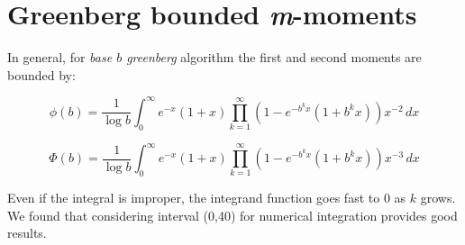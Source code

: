 \begin{appendices}
\begin{table}[H]
\caption[\emph{Clipped Modified Binary Tree}: Performance report.]{\emph{Clipped Modified Binary Tree}: performance report. Experimental results obtained by running CMBT algorithm on  random generated instances.}
\begin{center}
\end{center}
\end{table}


\section{Greenberg bounded \emph{m}-moments}
\label{sec:greenberg-moments}
In general, for \emph{base $b$ greenberg} algorithm the first and second moments are bounded by:

\begin{equation}
\phi(b)= \frac{1}{\log b} \int_{0}^{\infty} \! e^{-x}(1+x) \prod_{k=1}^{\infty}(1-e^{-b^{k}x}(1+b^{k}x))x^{-2} \, dx
\label{eq:greenberg-b-phi}
\end{equation}

\begin{equation}
\Phi(b)= \frac{1}{\log b} \int_{0}^{\infty} \! e^{-x}(1+x) \prod_{k=1}^{\infty}(1-e^{-b^{k}x}(1+b^{k}x))x^{-3} \, dx
\label{eq:greenberg-b-Phi}
\end{equation}

Even if the integral is improper, the integrand function goes fast to 0 as $k$ grows. We found that considering interval (0,40) for numerical integration provides good results.\\
\begin{comment}




\end{comment}


\end{appendices}
